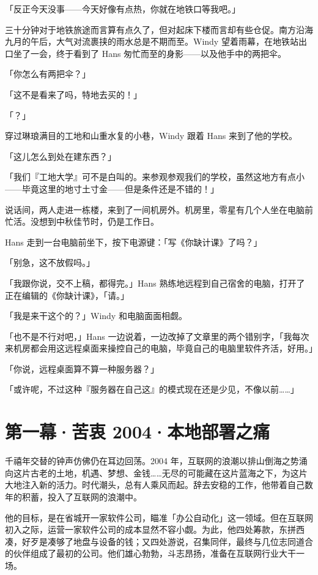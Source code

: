 「反正今天没事——今天好像有点热，你就在地铁口等我吧。」

三十分钟对于地铁旅途而言算有点久了，但对起床下楼而言却有些仓促。南方沿海九月的午后，大气对流裹挟的雨水总是不期而至。Windy 望着雨幕，在地铁站出口坐了一会，终于看到了 Hans 匆忙而至的身影——以及他手中的两把伞。

「你怎么有两把伞？」

「这不是看来了吗，特地去买的！」

「？」

穿过琳琅满目的工地和山重水复的小巷，Windy 跟着 Hans 来到了他的学校。

「这儿怎么到处在建东西？」

「我们『工地大学』可不是白叫的。来参观参观我们的学校，虽然这地方有点小——毕竟这里的地寸土寸金——但是条件还是不错的！」

说话间，两人走进一栋楼，来到了一间机房外。机房里，零星有几个人坐在电脑前忙活。没想到中秋佳节时，仍是工作日。

Hans 走到一台电脑前坐下，按下电源键：「写《你缺计课》了吗？」

「别急，这不放假吗。」

「我跟你说，交不上稿，都得完。」Hans 熟练地远程到自己宿舍的电脑，打开了正在编辑的《你缺计课》，「请。」

「我是来干这个的？」Windy 和电脑面面相觑。

「也不是不行对吧，」Hans 一边说着，一边改掉了文章里的两个错别字，「我每次来机房都会用这远程桌面来操控自己的电脑，毕竟自己的电脑里软件齐活，好用。」

「你说，远程桌面算不算一种服务器？」

「或许呢，不过这种『服务器在自己这』的模式现在还是少见，不像以前……」

\section{第一幕·苦衷 2004·本地部署之痛}

千禧年交替的钟声仿佛仍在耳边回荡。2004 年，互联网的浪潮以排山倒海之势涌向这片古老的土地，机遇、梦想、金钱……无尽的可能藏在这片蓝海之下，为这片大地注入新的活力。时代潮头，总有人乘风而起。辞去安稳的工作，他带着自己数年的积蓄，投入了互联网的浪潮中。

他的目标，是在省城开一家软件公司，瞄准「办公自动化」这一领域。但在互联网初入之际，运营一家软件公司的成本显然不容小觑。为此，他四处筹款，东拼西凑，好歹是凑够了地盘与设备的钱；又四处游说，召集同伴，最终与几位志同道合的伙伴组成了最初的公司。他们雄心勃勃，斗志昂扬，准备在互联网行业大干一场。

